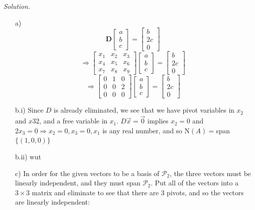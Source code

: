 \documentclass[12pt]{article}
\begin{document}
\begin{itemize}
\textit{Solution.}
\begin{itemize}
\item[a)] \[\mathbf{D} \left[\begin{array}{c} a \\ b \\ c\end{array}\right] =
          \left[\begin{array}{c} b \\ 2c \\  0\end{array}\right]\]
		  \[\Rightarrow\left[\begin{array}{ccc} x_1 & x_2 & x_3 \\ x_4 & x_5 & x_6 \\ x_7 & x_8 & x_9\end{array}\right]
          \left[\begin{array}{c} a \\ b \\ c\end{array}\right] =
          \left[\begin{array}{c} b \\ 2c \\  0\end{array}\right]\]
		  \[\Rightarrow\left[\begin{array}{ccc} 0 & 1 & 0 \\ 0 & 0 & 2 \\ 0 & 0 & 0\end{array}\right]
          \left[\begin{array}{c} a \\ b \\ c\end{array}\right] =
          \left[\begin{array}{c} b \\ 2c \\  0\end{array}\right]\]
\item[b.i)] Since $D$ is already eliminated, we see that we have pivot variables in $x_2$ and $x32$, and a free variable in $x_1$. $D\vec{x}=\vec{0}$ implies $x_2=0$ and $2x_3=0 \Rightarrow x_2=0, x_3=0, x_1$ is any real number, and so N$(A)=$span$\{(1,0,0)\}$
\item[b.ii)] wut
\item[c)] In order for the given vectors to be a basis of $\mathcal{P}_2$, the three vectors must be linearly independent, and they must span $\mathcal{P}_2$. Put all of the vectors into a $3\times 3$ matrix and eliminate to see that there are $3$ pivots, and so the vectors are linearly independent:

\end{itemize}
\end{itemize}
\end{document}
